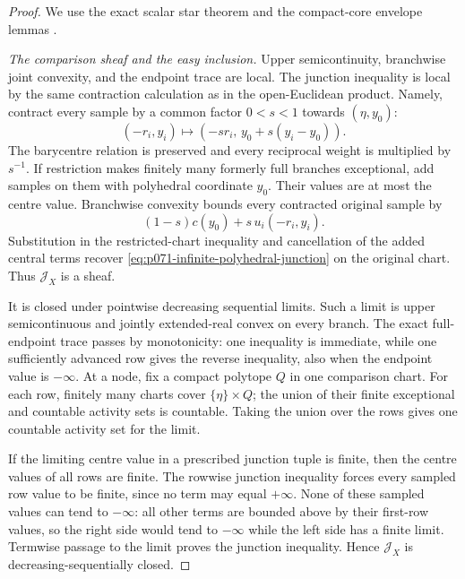 \begin{proof}
We use the exact scalar star theorem
 and the compact-core
envelope lemmas
.

\medskip\noindent
\emph{The comparison sheaf and the easy inclusion.}
Upper semicontinuity, branchwise joint convexity, and the endpoint trace are
local.  The junction inequality is local by the same contraction calculation
as in the open-Euclidean product.  Namely, contract every sample by a common
factor \(0<s<1\) towards \((\eta,y_0)\):
\[
 (-r_i,y_i)\longmapsto
       (-sr_i,\,y_0+s(y_i-y_0)).
\]
The barycentre relation is preserved and every reciprocal weight is
multiplied by \(s^{-1}\).  If restriction makes finitely many formerly full
branches exceptional, add samples on them with polyhedral coordinate
\(y_0\).  Their values are at most the centre value.  Branchwise convexity
bounds every contracted original sample by
\[
 (1-s)c(y_0)+s\,u_i(-r_i,y_i).
\]
Substitution in the restricted-chart inequality and cancellation of the
added central terms recover
\eqref{eq:p071-infinite-polyhedral-junction} on the original chart.  Thus
\(\mathcal J_X\) is a sheaf.

It is closed under pointwise decreasing sequential limits.  Such a limit is
upper semicontinuous and jointly extended-real convex on every branch.
The exact full-endpoint trace passes by monotonicity: one inequality is
immediate, while one sufficiently advanced row gives the reverse inequality,
also when the endpoint value is \(-\infty\).  At a node, fix a compact
polytope \(Q\) in one comparison chart.  For each row, finitely many charts
cover \(\{\eta\}\times Q\); the union of their finite exceptional and
countable activity sets is countable.  Taking the union over the rows gives
one countable activity set for the limit.

If the limiting centre value in a prescribed junction tuple is finite, then
the centre values of all rows are finite.  The rowwise junction inequality
forces every sampled row value to be finite, since no term may equal
\(+\infty\).  None of these sampled values can tend to \(-\infty\): all
other terms are bounded above by their first-row values, so the right side
would tend to \(-\infty\) while the left side has a finite limit.  Termwise
passage to the limit proves the junction inequality.  Hence
\(\mathcal J_X\) is decreasing-sequentially closed.


\end{proof}
